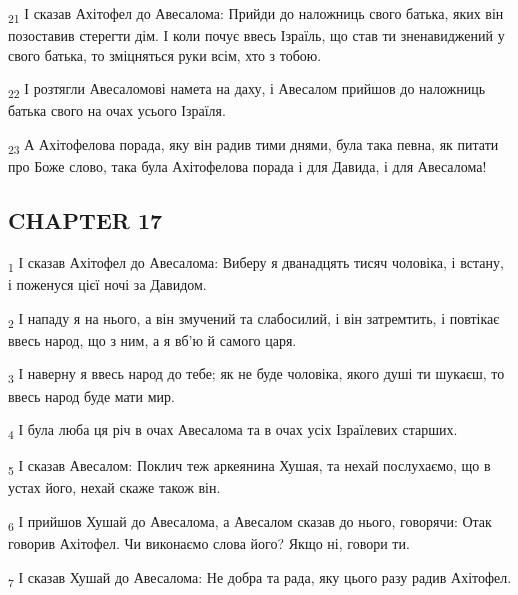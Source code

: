 \begin{tcolorbox}
\textsubscript{21} І сказав Ахітофел до Авесалома: Прийди до наложниць свого батька, яких він позоставив стерегти дім. І коли почує ввесь Ізраїль, що став ти зненавиджений у свого батька, то зміцняться руки всім, хто з тобою.
\end{tcolorbox}
\begin{tcolorbox}
\textsubscript{22} І розтягли Авесаломові намета на даху, і Авесалом прийшов до наложниць батька свого на очах усього Ізраїля.
\end{tcolorbox}
\begin{tcolorbox}
\textsubscript{23} А Ахітофелова порада, яку він радив тими днями, була така певна, як питати про Боже слово, така була Ахітофелова порада і для Давида, і для Авесалома!
\end{tcolorbox}
\subsection{CHAPTER 17}
\begin{tcolorbox}
\textsubscript{1} І сказав Ахітофел до Авесалома: Виберу я дванадцять тисяч чоловіка, і встану, і поженуся цієї ночі за Давидом.
\end{tcolorbox}
\begin{tcolorbox}
\textsubscript{2} І нападу я на нього, а він змучений та слабосилий, і він затремтить, і повтікає ввесь народ, що з ним, а я вб'ю й самого царя.
\end{tcolorbox}
\begin{tcolorbox}
\textsubscript{3} І наверну я ввесь народ до тебе; як не буде чоловіка, якого душі ти шукаєш, то ввесь народ буде мати мир.
\end{tcolorbox}
\begin{tcolorbox}
\textsubscript{4} І була люба ця річ в очах Авесалома та в очах усіх Ізраїлевих старших.
\end{tcolorbox}
\begin{tcolorbox}
\textsubscript{5} І сказав Авесалом: Поклич теж аркеянина Хушая, та нехай послухаємо, що в устах його, нехай скаже також він.
\end{tcolorbox}
\begin{tcolorbox}
\textsubscript{6} І прийшов Хушай до Авесалома, а Авесалом сказав до нього, говорячи: Отак говорив Ахітофел. Чи виконаємо слова його? Якщо ні, говори ти.
\end{tcolorbox}
\begin{tcolorbox}
\textsubscript{7} І сказав Хушай до Авесалома: Не добра та рада, яку цього разу радив Ахітофел.
\end{tcolorbox}
